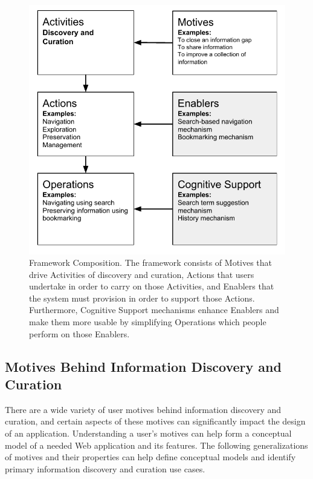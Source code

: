 \documentclass[review]{elsarticle}
\begin{document}
{\begin{figure}[ht!]
	\noindent
	\centering
    \includegraphics[width=\columnwidth]{figures/framework_overview.pdf}
	\caption{Framework Composition. The framework consists of Motives that drive Activities of discovery and curation, Actions that users undertake in order to carry on those Activities, and Enablers that the system must provision in order to support those Actions. Furthermore, Cognitive Support mechanisms enhance Enablers and make them more usable by simplifying Operations which people perform on those Enablers.}
	\label{fig:framework_overview} 
\end{figure}


{\subsection{Motives Behind Information Discovery and Curation}


There are a wide variety of user motives behind information discovery and curation, and certain aspects of these motives can significantly impact the design of an application. Understanding a user's motives can help form a conceptual model of a needed Web application and its features. The following generalizations of motives and their properties can help define conceptual models and identify primary information discovery and curation use cases.  

}}
\end{document}
